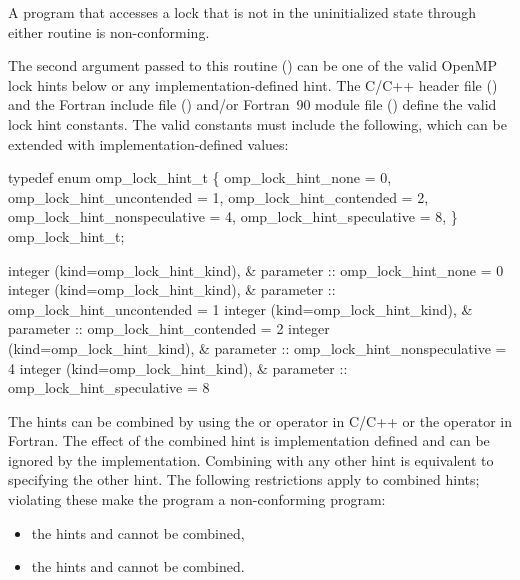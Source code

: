 \constraints
A program that accesses a lock that is not in the uninitialized state through either routine 
is non-conforming.

The second argument passed to this routine () can be one of the valid OpenMP lock hints below or any implementation-defined hint. 
The C/C++ header file () and the Fortran include file () and/or Fortran~90 module file () define the valid lock hint constants.  
The valid constants must include the following, which can be extended with implementation-defined values:

\ccppspecificstart
\begin{codepar}
typedef enum omp\_lock\_hint\_t \{
  omp\_lock\_hint\_none = 0,
  omp\_lock\_hint\_uncontended = 1,
  omp\_lock\_hint\_contended = 2,
  omp\_lock\_hint\_nonspeculative = 4,
  omp\_lock\_hint\_speculative = 8,
\} omp\_lock\_hint\_t;
\end{codepar}
\ccppspecificend

\fortranspecificstart
\begin{codepar}
integer (kind=omp\_lock\_hint\_kind), &
        parameter :: omp\_lock\_hint\_none = 0
integer (kind=omp\_lock\_hint\_kind), &
        parameter :: omp\_lock\_hint\_uncontended = 1
integer (kind=omp\_lock\_hint\_kind), &
        parameter :: omp\_lock\_hint\_contended = 2
integer (kind=omp\_lock\_hint\_kind), &
        parameter :: omp\_lock\_hint\_nonspeculative = 4 
integer (kind=omp\_lock\_hint\_kind), &
        parameter :: omp\_lock\_hint\_speculative = 8
\end{codepar}
\fortranspecificend

The hints can be combined by using the \code{+} or \code{|} operator in C/C++ or the \code{+} operator in Fortran.  
The effect of the combined hint is implementation defined and can be ignored by the implementation.
Combining  with any other hint is equivalent to specifying the other hint.
The following restrictions apply to combined hints; violating these make the program a non-conforming program:
\begin{itemize}
\item the hints  and  cannot be combined,
\item the hints  and  cannot be combined.
\end{itemize}


